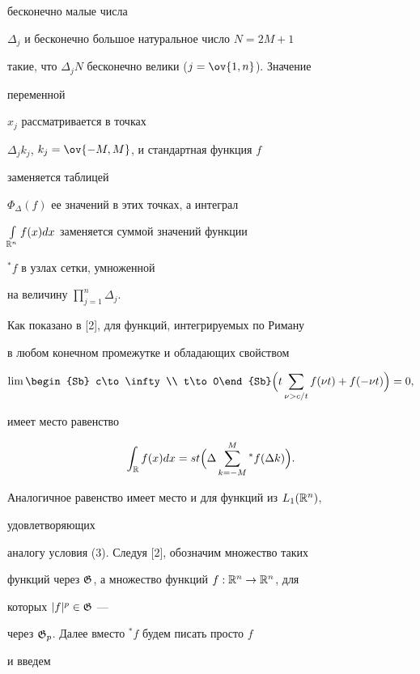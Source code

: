 бесконечно малые числа 


$\Delta_j$ и бесконечно большое натуральное число $N=2M+1$ 


такие, что $\Delta_j N$ бесконечно велики ($j=\ov{1,n}$). Значение 


переменной 


$x_j$ рассматривается в точках 


$\Delta_j k_j$, $k_j=\ov{-M,M}$, и стандартная функция $f$ 


заменяется таблицей 


$\Phi_\Delta(f)$ ее значений в этих точках, а интеграл 


$\int\limits_{\Bbb R^n}f(x)dx$ заменяется суммой значений функции 


${}^*f$ в узлах сетки, умноженной 


на величину $\prod\limits^n_{j=1}\Delta_j$. 


 


Как показано в [2], для функций, интегрируемых по Риману 


в любом конечном промежутке и обладающих свойством 


\begin{equation} 


\lim\begin{Sb} c\to\infty \\ t\to 0\end{Sb} 


\Big(t\sum_{\nu>c/t}f(\nu t)+f(-\nu t)\Big)=0, 


\end{equation} 


имеет место равенство 


$$ 


\int_{\Bbb R}f(x)dx=st\Big(\Delta\sum^M_{k=-M}{}^*f(\Delta k)\Big). 


$$ 


Аналогичное равенство имеет место и для функций из $L_1(\Bbb R^n)$, 


удовлетворяющих 


аналогу условия (3). Следуя [2], обозначим множество таких 


функций через $\frak G$, а множество функций $f:\Bbb R^n\to \Bbb R^n$, для 


которых $|f|^p\in\frak G$ ---  


через $\frak G_p$. Далее вместо ${}^*f$ будем писать просто $f$ 


и введем 


